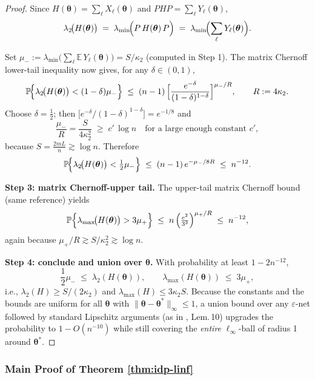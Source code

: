 \documentclass[letterpaper,12pt]{article}
\numberwithin{equation}{section}
\theoremstyle{plain}
\numberwithin{Theorem}{section}
\numberwithin{corollary}{section}
\numberwithin{proposition}{section}
\numberwithin{Lemma}{section}
{
	\theoremstyle{definition}
	\newtheorem{Definition}{Definition}
	\newtheorem{example}{Example}
	\numberwithin{example}{section}
	\newtheorem{fact}{Fact}
	\numberwithin{fact}{section}
	\newtheorem{remark}{Remark}
}
\newcommand{\1}{\mathbbm{1}}
\def\bth{{\boldsymbol{\theta}}}
\def\Pr{\mathbb P}
\def\E{\mathbb{E}}
\begin{document}
\begin{proof}
	Since \(H(\bth)=\sum_{\ell}X_\ell(\bth)\) and
	\(PHP=\sum_{\ell}Y_\ell(\bth)\),
	\[
	\lambda_{2}\!\bigl(H(\bth)\bigr)
	\;=\;
	\lambda_{\min}\!\Bigl(P\,H(\bth)\,P\Bigr)
	\;=\;
	\lambda_{\min}\!\Bigl(\sum_{\ell}Y_\ell(\bth)\Bigr).
	\]
	
	Set \(\mu_{-}:=\lambda_{\min}\!\bigl(\sum_{\ell}\E\,Y_\ell(\bth)\bigr)
	=S/\kappa_{2}\)
	(computed in Step 1).
	The matrix Chernoff lower-tail inequality \cite[Thm 1.1]{tropp2012user}
 now gives, for any
	\(\delta\in(0,1)\),
	\[
	\Pr\!\Bigl\{
	\lambda_{2}\!\bigl(H(\bth)\bigr)
	< (1-\delta)\mu_{-}
	\Bigr\}
	\;\le\;
	(n-1)\,
	\Bigl[
	\frac{e^{-\delta}}{(1-\delta)^{1-\delta}}
	\Bigr]^{\mu_{-}/R},
	\qquad
	R:=4\kappa_{2}.
	\]
	Choose \(\delta=\tfrac12\); then
	\(\bigl[e^{-\delta}/(1-\delta)^{1-\delta}\bigr]=e^{-1/8}\) and
	\[
	\frac{\mu_{-}}{R}
	=\frac{S}{4\kappa_{2}^{2}}
	\;\ge\;
	c'\,\log n
	\quad\text{for a large enough constant }c',
	\]
	because \(S=\frac{2mL}{n}\gtrsim\log n\).
	Therefore
	\[
	\Pr\!\Bigl\{
	\lambda_{2}\!\bigl(H(\bth)\bigr)
	< \tfrac12\mu_{-}
	\Bigr\}
	\;\le\;
	(n-1)\,e^{-\mu_{-}/8R}
	\;\le\;
	n^{-12}.
	\]
	
	
	\medskip
	\noindent
	\textbf{Step 3: matrix Chernoff-upper tail.}
	The upper-tail matrix Chernoff bound (same reference) yields
	\[
	\Pr\Bigl\{
	\lambda_{\max}\!\bigl(H(\bth)\bigr)
	> 3\mu_{+}
	\Bigr\}
	\;\le\;
	n\,\Bigl(\tfrac{e^{2}}{3^{3}}\Bigr)^{\mu_{+}/R}
	\;\le\;
	n^{-12},
	\]
	again because $\mu_{+}/R\gtrsim S/\kappa_{2}^{2}\gtrsim\log n$.
	
	\medskip
	\noindent
	\textbf{Step 4: conclude and union over \(\bth\).}
	With probability at least \(1-2n^{-12}\),
	\[
	\frac12\mu_{-}\;\le\;\lambda_{2}(H(\bth)),
	\qquad
	\lambda_{\max}(H(\bth))\;\le\;3\mu_{+},
	\]
	i.e.,
	\(
	\lambda_{2}(H)\ge S/(2\kappa_{2})
	\)
	and
	\(
	\lambda_{\max}(H)\le 3\kappa_{2}S.
	\)
	Because the constants and the bounds are uniform for all
	\(\bth\) with \(\|\bth-\bth^{*}\|_{\infty}\le1\),
	a union bound over any \(\varepsilon\)-net followed by standard
	Lipschitz arguments (as in \cite{chen2019spectral}, Lem.\,10) upgrades
	the probability to \(1-O(n^{-10})\) while still covering the \emph{entire}
	$\ell_\infty$-ball of radius 1 around $\bth^{*}$.
\end{proof}

\subsubsection{Main Proof of Theorem \ref{thm:idp-linf}}
\label{sec:pf-idp-linf}
\end{document}
